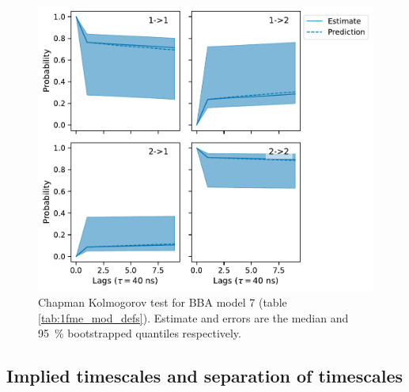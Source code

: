\documentclass{article}
\begin{document}
\begin{figure}
    \centering
    \includegraphics[height=0.4\textheight]{figures/cktests/bba/m2_dist_hpix27_cktest.pdf}
    \caption{Chapman Kolmogorov test for BBA model 7 (table \ref{tab:1fme_mod_defs}). Estimate and errors are the median and \SI{95}{\percent} bootstrapped quantiles respectively.}
    \label{fig:cktest_bba_7}
\end{figure}

\clearpage
\subsection{Implied timescales and separation of timescales}
\end{document}
